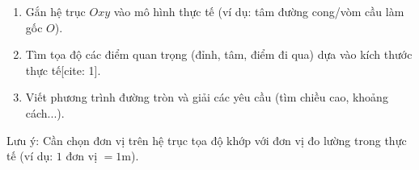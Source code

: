 \begin{enumerate}
\item Gắn hệ trục $Oxy$ vào mô hình thực tế (ví dụ: tâm đường cong/vòm cầu làm gốc $O$).
\item Tìm tọa độ các điểm quan trọng (đỉnh, tâm, điểm đi qua) dựa vào kích thước thực tế[cite: 1].
\item Viết phương trình đường tròn và giải các yêu cầu (tìm chiều cao, khoảng cách...).
\end{enumerate}
Lưu ý: Cần chọn đơn vị trên hệ trục tọa độ khớp với đơn vị đo lường trong thực tế (ví dụ: $1$ đơn vị $= 1\text{m}$).
